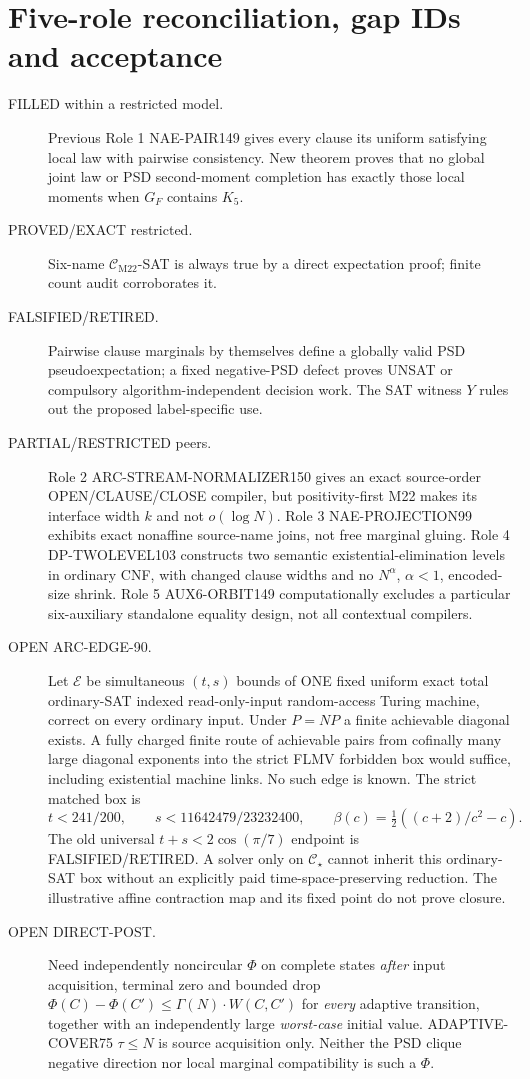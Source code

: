 \documentclass[11pt]{article}
\newcommand{\CM}{\mathcal C_{\mathrm{M22}}}
\newcommand{\CS}{\mathcal C_\star}
\begin{document}
\section{Five-role reconciliation, gap IDs and acceptance}
\begin{description}
\item[FILLED within a restricted model.] Previous Role 1 NAE-PAIR149 gives every clause its uniform satisfying local law with pairwise consistency. New theorem proves that no global joint law or PSD second-moment completion has exactly those local moments when $G_F$ contains $K_5$.
\item[PROVED/EXACT restricted.] Six-name $\CM$-SAT is always true by a direct expectation proof; finite count audit corroborates it.
\item[FALSIFIED/RETIRED.] Pairwise clause marginals by themselves define a globally valid PSD pseudoexpectation; a fixed negative-PSD defect proves UNSAT or compulsory algorithm-independent decision work. The SAT witness $Y$ rules out the proposed label-specific use.
\item[PARTIAL/RESTRICTED peers.] Role 2 ARC-STREAM-NORMALIZER150 gives an exact source-order OPEN/CLAUSE/CLOSE compiler, but positivity-first M22 makes its interface width $k$ and not $o(\log N)$. Role 3 NAE-PROJECTION99 exhibits exact nonaffine source-name joins, not free marginal gluing. Role 4 DP-TWOLEVEL103 constructs two semantic existential-elimination levels in ordinary CNF, with changed clause widths and no $N^\alpha$, $\alpha<1$, encoded-size shrink. Role 5 AUX6-ORBIT149 computationally excludes a particular six-auxiliary standalone equality design, not all contextual compilers.
\item[OPEN ARC-EDGE-90.] Let $\mathcal E$ be simultaneous $(t,s)$ bounds of ONE fixed uniform exact total ordinary-SAT indexed read-only-input random-access Turing machine, correct on every ordinary input. Under $P=NP$ a finite achievable diagonal exists. A fully charged finite route of achievable pairs from cofinally many large diagonal exponents into the strict FLMV forbidden box would suffice, including existential machine links. No such edge is known. The strict matched box is
\[
t<241/200,\qquad s<11642479/23232400,\qquad
\beta(c)=\tfrac12((c+2)/c^2-c).
\]
The old universal $t+s<2\cos(\pi/7)$ endpoint is FALSIFIED/RETIRED. A solver only on $\CS$ cannot inherit this ordinary-SAT box without an explicitly paid time-space-preserving reduction. The illustrative affine contraction map and its fixed point do not prove closure.
\item[OPEN DIRECT-POST.] Need independently noncircular $\Phi$ on complete states \emph{after} input acquisition, terminal zero and bounded drop $\Phi(C)-\Phi(C')\le\Gamma(N)\cdot W(C,C')$ for \emph{every} adaptive transition, together with an independently large \emph{worst-case} initial value. ADAPTIVE-COVER75 $\tau\le N$ is source acquisition only. Neither the PSD clique negative direction nor local marginal compatibility is such a $\Phi$.
\end{description}
\end{document}
